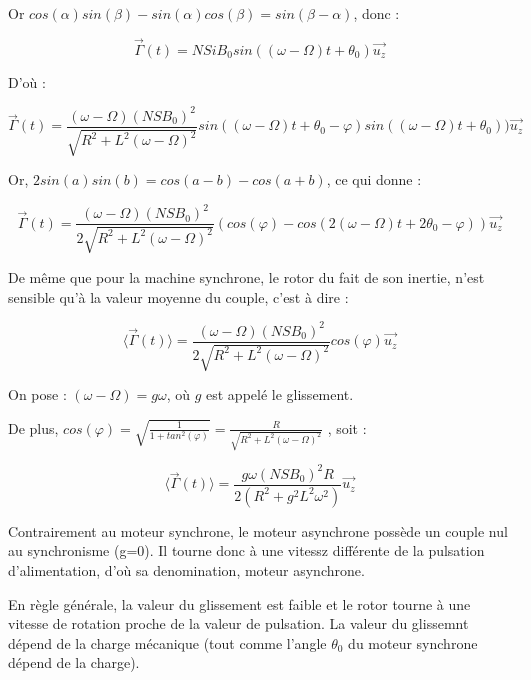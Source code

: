 \documentclass{article}
\begin{document}
Or $cos(\alpha)sin(\beta) - sin(\alpha)cos(\beta) = sin(\beta - \alpha)$, donc :

\begin{equation}
    \vec{\Gamma}(t) = NSiB_0 sin ((\omega - \Omega) t + \theta_0) \vec{u_z}
\end{equation}

D'où :

\begin{equation}
     \vec{\Gamma}(t) = \frac{(\omega - \Omega)(NSB_0)^2}{\sqrt{R^2+L^2(\omega - \Omega)^2}} sin((\omega - \Omega) t + \theta_0 - \varphi)sin((\omega - \Omega) t + \theta_0))\vec{u_z}
\end{equation}

Or, $2sin(a)sin(b) = cos(a - b) - cos(a+b)$, ce qui donne :

\begin{equation}
     \vec{\Gamma}(t) = \frac{(\omega - \Omega)(NSB_0)^2}{2\sqrt{R^2+L^2(\omega - \Omega)^2}} (cos(\varphi) - cos (2(\omega - \Omega) t + 2 \theta_0 - \varphi))\vec{u_z}
\end{equation}

De même que pour la machine synchrone, le rotor du fait de son inertie, n'est sensible qu'à la valeur moyenne du couple, c'est à dire :

\begin{equation}
    \langle \vec{\Gamma}(t) \rangle = \frac{(\omega - \Omega)(NSB_0)^2}{2\sqrt{R^2+L^2(\omega - \Omega)^2}} cos(\varphi) \vec{u_z}
\end{equation}

On pose : $(\omega - \Omega) = g\omega$, où $g$ est appelé le glissement.\medskip

De plus, $cos(\varphi) = \sqrt{\frac{1}{1 + tan^2 (\varphi)}}= \frac{R}{\sqrt{R^2 + L^2(\omega -\Omega)^2}}$ , soit :

\begin{equation}
     \langle \vec{\Gamma}(t) \rangle = \frac{g\omega (NSB_0)^2R}{2(R^2 + g^2L^2\omega^2)}\vec{u_z}
\end{equation}

Contrairement au moteur synchrone, le moteur asynchrone possède un couple nul au synchronisme (g=0). Il tourne donc à une vitessz différente de la pulsation d'alimentation, d'où sa denomination, moteur asynchrone.\medskip

En règle générale, la valeur du glissement est faible et le rotor tourne à une vitesse de rotation proche de la valeur de pulsation. La valeur du glissemnt dépend de la charge mécanique (tout comme l'angle $\theta_0$ du moteur synchrone dépend de la charge).\medskip
\end{document}
